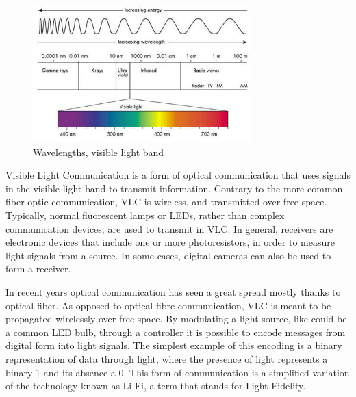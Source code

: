 \label{sectionVLC}
\begin{figure}[hbt]
	\centering
  \includegraphics[height=200px]{img/wavelengths}
  \caption{Wavelengths, visible light band}
  \label{fig:wavelength}
\end{figure}

Visible Light Communication is a form of optical communication that uses signals in the visible light band to transmit information.
Contrary to the more common fiber-optic communication, VLC is wireless, and transmitted over free space.
Typically, normal fluorescent lamps or LEDs, rather than complex communication devices,  are used to transmit in VLC.
In general, receivers are electronic devices that include one or more photoresistors, in order to measure light signals from a source.
In some cases, digital cameras can also be used to form a receiver. 



In recent years optical communication has seen a great spread mostly thanks to optical fiber.
As opposed to optical fibre communication, VLC is meant to be propagated wirelessly over free space.
By modulating a light source, like could be a common LED bulb, through a controller it is possible to encode messages from digital form into light signals.
The simplest example of this encoding is a binary representation of data through light, where the presence of light represents a binary 1 and its absence a 0.
This form of communication is a simplified variation of the technology known as Li-Fi, a term that stands for Light-Fidelity.

